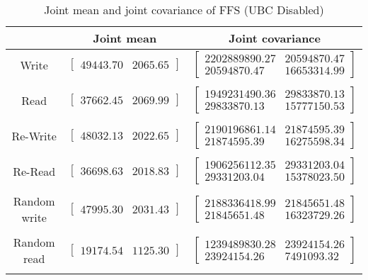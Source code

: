 
	\begin{table}
	\caption{Joint mean and joint covariance of FFS (UBC Disabled)}
	\begin{tabular}{| c | c | c |}
	\hline
	{} & \textbf{Joint mean} & \textbf{Joint covariance}\\
	\hline
	\hline
Write & $\left[ \begin{array}{rr} 49443.70 & 2065.65 \end{array}\right] $ & $\left[ \begin{array}{rr} 2202889890.27 & 20594870.47 \\ 20594870.47 & 16653314.99 \end{array}\right] $\\ 
{} & {} & {} \\ 
Read & $\left[ \begin{array}{rr} 37662.45 & 2069.99 \end{array}\right] $ & $\left[ \begin{array}{rr} 1949231490.36 & 29833870.13 \\ 29833870.13 & 15777150.53 \end{array}\right] $\\ 
{} & {} & {} \\ 
Re-Write & $\left[ \begin{array}{rr} 48032.13 & 2022.65 \end{array}\right] $ & $\left[ \begin{array}{rr} 2190196861.14 & 21874595.39 \\ 21874595.39 & 16275598.34 \end{array}\right] $\\ 
{} & {} & {} \\ 
Re-Read & $\left[ \begin{array}{rr} 36698.63 & 2018.83 \end{array}\right] $ & $\left[ \begin{array}{rr} 1906256112.35 & 29331203.04 \\ 29331203.04 & 15378023.50 \end{array}\right] $\\ 
{} & {} & {} \\ 
Random write & $\left[ \begin{array}{rr} 47995.30 & 2031.43 \end{array}\right] $ & $\left[ \begin{array}{rr} 2188336418.99 & 21845651.48 \\ 21845651.48 & 16323729.26 \end{array}\right] $\\ 
{} & {} & {} \\ 
Random read & $\left[ \begin{array}{rr} 19174.54 & 1125.30 \end{array}\right] $ & $\left[ \begin{array}{rr} 1239489830.28 & 23924154.26 \\ 23924154.26 & 7491093.32 \end{array}\right] $\\ 
{} & {} & {} \\ 

	\hline
	\end{tabular}
	\label{tbl:stat-ffs_ubc_disabled}
	\end{table}
